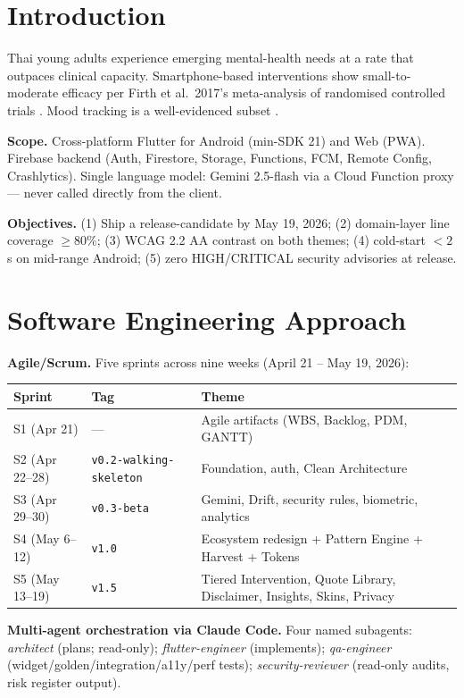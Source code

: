 \documentclass[11pt,a4paper]{article}
\begin{document}
\section{Introduction}

Thai young adults experience emerging mental-health needs at a rate that
outpaces clinical capacity. Smartphone-based interventions show
small-to-moderate efficacy per Firth et al.\ 2017's meta-analysis of
randomised controlled trials \autocite{firth2017meta}. Mood tracking is a
well-evidenced subset \autocite{kauer2012jmir,bakker2018moodprism}.

\textbf{Scope.} Cross-platform Flutter for Android (min-SDK 21) and Web
(PWA). Firebase backend (Auth, Firestore, Storage, Functions, FCM,
Remote Config, Crashlytics). Single language model: Gemini 2.5-flash via
a Cloud Function proxy --- never called directly from the client.

\textbf{Objectives.} (1) Ship a release-candidate by May 19, 2026; (2)
domain-layer line coverage $\geq 80\%$; (3) WCAG 2.2 AA contrast on both
themes; (4) cold-start $<2\,$s on mid-range Android; (5) zero
HIGH/CRITICAL security advisories at release.

\section{Software Engineering Approach}

\textbf{Agile/Scrum.} Five sprints across nine weeks
(April 21 -- May 19, 2026):

\begin{longtable}{lll}
\toprule
\textbf{Sprint} & \textbf{Tag} & \textbf{Theme} \\
\midrule
S1 (Apr 21) & --- & Agile artifacts (WBS, Backlog, PDM, GANTT) \\
S2 (Apr 22--28) & \texttt{v0.2-walking-skeleton} & Foundation, auth, Clean Architecture \\
S3 (Apr 29--30) & \texttt{v0.3-beta} & Gemini, Drift, security rules, biometric, analytics \\
S4 (May 6--12) & \texttt{v1.0} & Ecosystem redesign + Pattern Engine + Harvest + Tokens \\
S5 (May 13--19) & \texttt{v1.5} & Tiered Intervention, Quote Library, Disclaimer, Insights, Skins, Privacy \\
\bottomrule
\end{longtable}

\textbf{Multi-agent orchestration via Claude Code.} Four named
subagents: \emph{architect} (plans; read-only); \emph{flutter-engineer}
(implements); \emph{qa-engineer} (widget/golden/integration/a11y/perf
tests); \emph{security-reviewer} (read-only audits, risk register
output).
\end{document}
